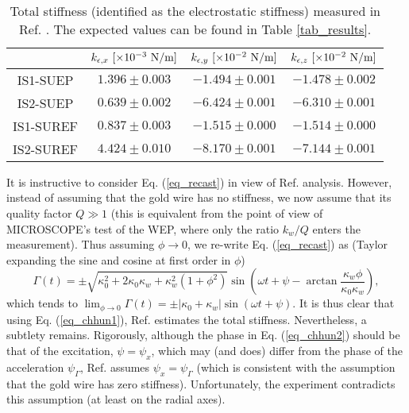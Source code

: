\documentclass[12pt]{iopart}
\begin{document}
\begin{table}%
\caption{Total stiffness (identified as the electrostatic stiffness) measured in Ref. \cite{chhuncqg5}. The expected values can be found in Table \ref{tab_results}.}
\begin{center}
\begin{tabular}{cccc}
\hline
& $k_{\epsilon,x}~[\times10^{-3}~{\rm N/m}]$ & $k_{\epsilon,y}~[\times10^{-2}~{\rm N/m}]$ & $k_{\epsilon,z}~[\times10^{-2}~{\rm N/m}]$ \\
\hline
IS1-SUEP & $1.396\pm0.003$ & $-1.494\pm0.001$ & $-1.478\pm0.002$ \\
IS2-SUEP & $0.639\pm0.002$ & $-6.424\pm0.001$ & $-6.310\pm0.001$ \\
IS1-SUREF & $0.837\pm0.003$ & $-1.515\pm0.000$ & $-1.514\pm0.000$ \\
IS2-SUREF &  $4.424\pm0.010$ & $-8.170\pm0.001$ & $-7.144\pm0.001$ \\
\hline
\end{tabular}
\end{center}\label{tab_chhun}
\label{default}
\end{table}%

It is instructive to consider Eq. (\ref{eq_recast}) in view of Ref. \cite{chhuncqg5} analysis. However, instead of assuming that the gold wire has no stiffness, we now assume that its quality factor $Q\gg 1$ (this is equivalent from the point of view of MICROSCOPE's test of the WEP, where only the ratio $k_w/Q$ enters the measurement). Thus assuming $\phi \rightarrow 0$, we re-write Eq. (\ref{eq_recast}) as (Taylor expanding the sine and cosine at first order in $\phi$)
\begin{equation} \label{eq_chhun2}
\Gamma(t) = \pm \sqrt{\kappa_0^2 + 2\kappa_0 \kappa_w + \kappa_w^2 (1+\phi^2)} \sin\left( \omega t + \psi - \arctan \frac{\kappa_w \phi}{\kappa_0 \kappa_w}\right),
\end{equation}
which tends to $\lim_{\phi \to 0} \Gamma(t) = \pm|\kappa_0 + \kappa_w| \sin(\omega t + \psi)$.
It is thus clear that using Eq. (\ref{eq_chhun1}), Ref. \cite{chhuncqg5} estimates the total stiffness. Nevertheless, a subtlety remains. Rigorously, although the phase in Eq. (\ref{eq_chhun2}) should be that of the excitation, $\psi=\psi_x$, which may (and does) differ from the phase of the acceleration $\psi_\Gamma$, Ref. \cite{chhuncqg5} assumes $\psi_x=\psi_\Gamma$ (which is consistent with the assumption that the gold wire has zero stiffness). Unfortunately, the experiment contradicts this assumption (at least on the radial axes). 
\end{document}
